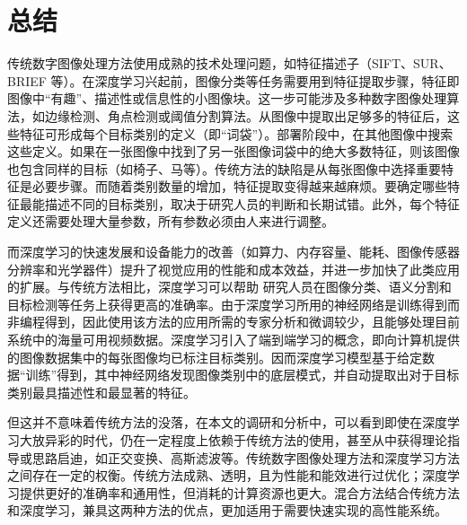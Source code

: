\section{总结}
\label{sec:conclusion}

传统数字图像处理方法使用成熟的技术处理问题，如特征描述子（SIFT、SUR、BRIEF 等）。在深度学习兴起前，图像分类等任务需要用到特征提取步骤，特征即图像中``有趣''、描述性或信息性的小图像块。这一步可能涉及多种数字图像处理算法，如边缘检测、角点检测或阈值分割算法。从图像中提取出足够多的特征后，这些特征可形成每个目标类别的定义（即``词袋''）。部署阶段中，在其他图像中搜索这些定义。如果在一张图像中找到了另一张图像词袋中的绝大多数特征，则该图像也包含同样的目标（如椅子、马等）。传统方法的缺陷是从每张图像中选择重要特征是必要步骤。而随着类别数量的增加，特征提取变得越来越麻烦。要确定哪些特征最能描述不同的目标类别，取决于研究人员的判断和长期试错。此外，每个特征定义还需要处理大量参数，所有参数必须由人来进行调整。

而深度学习的快速发展和设备能力的改善（如算力、内存容量、能耗、图像传感器分辨率和光学器件）提升了视觉应用的性能和成本效益，并进一步加快了此类应用的扩展。与传统方法相比，深度学习可以帮助 研究人员在图像分类、语义分割和目标检测等任务上获得更高的准确率。由于深度学习所用的神经网络是训练得到而非编程得到，因此使用该方法的应用所需的专家分析和微调较少，且能够处理目前系统中的海量可用视频数据。深度学习引入了端到端学习的概念，即向计算机提供的图像数据集中的每张图像均已标注目标类别。因而深度学习模型基于给定数据``训练''得到，其中神经网络发现图像类别中的底层模式，并自动提取出对于目标类别最具描述性和最显著的特征。

但这并不意味着传统方法的没落，在本文的调研和分析中，可以看到即使在深度学习大放异彩的时代，仍在一定程度上依赖于传统方法的使用，甚至从中获得理论指导或思路启迪，如正交变换、高斯滤波等。传统数字图像处理方法和深度学习方法之间存在一定的权衡。传统方法成熟、透明，且为性能和能效进行过优化；深度学习提供更好的准确率和通用性，但消耗的计算资源也更大。混合方法结合传统方法和深度学习，兼具这两种方法的优点，更加适用于需要快速实现的高性能系统。